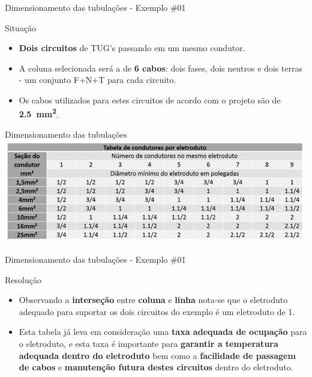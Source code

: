 \begin{frame}{Dimensionamento das tubulações - Exemplo \#01}
	\begin{block}{Situação}
		\begin{itemize}
			\item \textbf{Dois circuitos }de TUG's passando em um mesmo condutor.
			\item A coluna selecionada será a de \textbf{6 cabos}: dois fases, dois neutros e dois terras - um conjunto F+N+T para cada circuito.
			\item Os cabos utilizados para estes circuitos de acordo com o projeto são de \textbf{\SI{2.5}{\milli\meter\squared}}.
		\end{itemize}
	\end{block}
\end{frame}


\begin{frame}{Dimensionamento das tubulações}
	\centering
	\includegraphics[width=1\linewidth]{Figuras/Ch06/fig10}
\end{frame}


\begin{frame}{Dimensionamento das tubulações - Exemplo \#01}
	\begin{block}{Resolução}
		\begin{itemize}
			\item Observando a \textbf{interseção} entre \textbf{coluna} e \textbf{linha} nota-se que o eletroduto adequado para suportar os dois circuitos do exemplo é um eletroduto de \SI{1}{\pol}.
			\item Esta tabela já leva em consideração uma \textbf{taxa adequada de ocupação} para o eletroduto, e esta taxa é importante para \textbf{garantir a temperatura adequada dentro do eletroduto} bem como a \textbf{facilidade de passagem de cabos} e \textbf{manutenção futura destes circuitos} dentro do eletroduto.
		\end{itemize}
	\end{block}
\end{frame}



